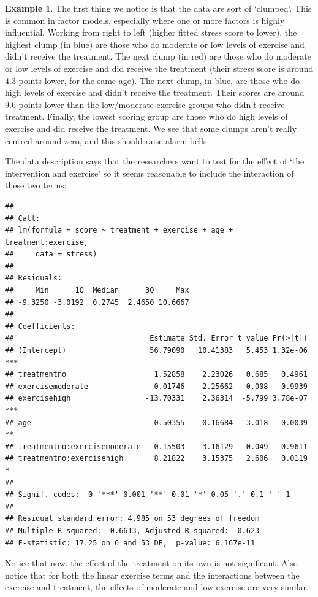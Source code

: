 \documentclass[
  openany]{book}
\theoremstyle{definition}
\theoremstyle{definition}
\newtheorem{example}{Example}[chapter]
\theoremstyle{definition}
\theoremstyle{definition}
\theoremstyle{remark}
\begin{document}
\begin{example}
The first thing we notice is that the data are sort of `clumped'. This is common in factor models, especially where one or more factors is highly influential. Working from right to left (higher fitted stress score to lower), the highest clump (in blue) are those who do moderate or low levels of exercise and didn't receive the treatment. The next clump (in red) are those who do moderate or low levels of exercise and did receive the treatment (their stress score is around 4.3 points lower, for the same age). The next clump, in blue, are those who do high levels of exercise and didn't receive the treatment. Their scores are around 9.6 points lower than the low/moderate exercise groups who didn't receive treatment. Finally, the lowest scoring group are those who do high levels of exercise and did receive the treatment. We see that some clumps aren't really centred around zero, and this should raise alarm bells.

The data description says that the researchers want to test for the effect of `the intervention and exercise' so it seems reasonable to include the interaction of these two terms:

\begin{verbatim}
## 
## Call:
## lm(formula = score ~ treatment + exercise + age + treatment:exercise, 
##     data = stress)
## 
## Residuals:
##     Min      1Q  Median      3Q     Max 
## -9.3250 -3.0192  0.2745  2.4650 10.6667 
## 
## Coefficients:
##                               Estimate Std. Error t value Pr(>|t|)    
## (Intercept)                   56.79090   10.41383   5.453 1.32e-06 ***
## treatmentno                    1.52858    2.23026   0.685   0.4961    
## exercisemoderate               0.01746    2.25662   0.008   0.9939    
## exercisehigh                 -13.70331    2.36314  -5.799 3.78e-07 ***
## age                            0.50355    0.16684   3.018   0.0039 ** 
## treatmentno:exercisemoderate   0.15503    3.16129   0.049   0.9611    
## treatmentno:exercisehigh       8.21822    3.15375   2.606   0.0119 *  
## ---
## Signif. codes:  0 '***' 0.001 '**' 0.01 '*' 0.05 '.' 0.1 ' ' 1
## 
## Residual standard error: 4.985 on 53 degrees of freedom
## Multiple R-squared:  0.6613, Adjusted R-squared:  0.623 
## F-statistic: 17.25 on 6 and 53 DF,  p-value: 6.167e-11
\end{verbatim}

Notice that now, the effect of the treatment on its own is not significant. Also notice that for both the linear exercise terms and the interactions between the exercise and treatment, the effects of moderate and low exercise are very similar.


\end{example}
\end{document}
